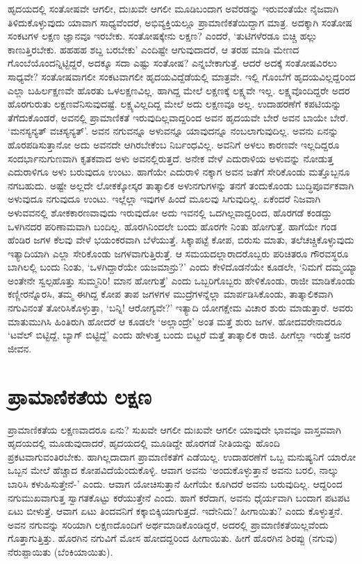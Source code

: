ಹೃದಯದಲ್ಲಿ ಸಂತೋಷವೇ ಆಗಲೀ, ದುಃಖವೇ ಆಗಲೀ ಮೂಡಿಬಂದಾಗ ಅವೆರಡನ್ನು ಇರುವಂತೆಯೇ ನೈಜವಾಗಿ ತಿಳಿದುಕೊಳ್ಳುವುದು ಯಾವಾಗ ಸಾಧ್ಯವೆಂದರೆ, ಅಭಿವ್ಯಕ್ತಿಯಲ್ಲೂ ಪ್ರಾಮಾಣಿಕತೆಯಿದ್ದಾಗ ಮಾತ್ರ. ಅದಕ್ಕಾಗಿ ಸಂತೋಷ ಸಂಕಟಗಳ ಲಕ್ಷಣ ಜ್ಞಾನವೂ ಇರಬೇಕು. ಸಂತೋಷಕ್ಕೇನು ಲಕ್ಷಣ? ಎಂದರೆ, `ತುಟಿಗಳೆರಡೂ ಬಿಚ್ಚಿ ಹಲ್ಲು ಕಾಣುತ್ತಿರಬೇಕು. ಹಹಹಹ ಶಬ್ದ ಬರಬೇಕು' ಎಂದಿಷ್ಟೇ ಆಗುವುದಾದರೆ, ಆ ತರಹ ಮಾಡಿ ಮೇಣದ ಗೊಂಬೆಯೊಂದನ್ನಿಟ್ಟಿದ್ದರೆ, ಅದಕ್ಕೂ ಸದಾ ಎಷ್ಟು ಸಂತೋಷ? ಎನ್ನಬೇಕಾಗುತ್ತೆ. ಆದರೆ ಅದಕ್ಕೆ ಸಂತೋಷವಿರಲು ಸಾಧ್ಯವೇ? ಸಂತೋಷವಾಗಲೀ ಸಂಕಟವಾಗಲೀ ಹೃದಯವಿದ್ದೆಡೆಯಲ್ಲಿ ಮಾತ್ರವೇ. ಇಲ್ಲಿ ಗೊಂಬೆಗೆ ಹೃದಯವಿಲ್ಲದ್ದರಿಂದ ಎಲ್ಲಾ ಬಹಿರ್ಲಕ್ಷಣವೇ ಹೊರತು ಒಳಲಕ್ಷಣವಿಲ್ಲ. ಹಾಗಿದ್ದ ಮೇಲೆ ಲಕ್ಷಣಕ್ಕೆ ಲಕ್ಷ್ಯವೇ ಇಲ್ಲ. ಲಕ್ಷ್ಯವೊಂದಿದ್ದರೇ ಅದರ ಹೊರಗುರುತು ಲಕ್ಷಣವೆನಿಸುವುದಷ್ಟೆ. ಲಕ್ಷ್ಯವಿಲ್ಲದಿದ್ದ ಮೇಲೆ ಅದು ಲಕ್ಷಣವೂ ಅಲ್ಲ. ಉದಾಹರಣೆಗೆ ಕಪಟಿಯನ್ನು ತೆಗೆದುಕೊಂಡರೆ, ಅವನಲ್ಲಿ ಪ್ರಾಮಾಣಿಕತೆ ಇರುವುದಿಲ್ಲವಾದ್ದರಿಂದ ಅವನ ಹೃದಯವೇ ಬೇರೆ ಅವನ ಬಾಯೇ ಬೇರೆ. `ಮನಸ್ಯನ್ಯತ್ ವಚಸ್ಯನ್ಯತ್'.\label{102} ಅವನ ನಗುವನ್ನೂ ಅಳುವನ್ನೂ ಯಾವುದನ್ನೂ ನಂಬಲಾಗುವುದಿಲ್ಲ. ಅವನು ಏನನ್ನು  ಹೊರಪಡಿಸುತ್ತಾನೋ ಅದು ಅವನದೇ ಆಗಿರಬೇಕೆಂಬ ನಿರ್ಬಂಧವಿಲ್ಲ. ಅವನಿಗೆ ಅಳಲು ಕಾರಣವೇ ಇಲ್ಲದಿದ್ದರೂ ಸಂದರ್ಭಾನುಗುಣವಾಗಿ ಕೃತಕವಾದ ಅಳು ಅವನಲ್ಲಿರುತ್ತದೆ. ಅನೇಕ ವೇಳೆ ಎದುರಾಳಿಯ ಅಳುವನ್ನು ನೋಡುತ್ತ ಎದುರಾಳಿಗೂ ಅಳು ಬರುವುದೂ ಉಂಟು. ಹಾಗೆಯೇ ಎದುರಾಳಿ ನಕ್ಕಾಗ ಅವನ ಜತೆಗೆ ಸೇರಿಕೊಂಡು ಮತ್ತೊಬ್ಬನೂ ನಗಬಹುದು. ಅಷ್ಟೇ ಅಲ್ಲದೇ ಲೋಕಕ್ಕೋಸ್ಕರ ತಾತ್ಕಾಲಿಕ ಅಳುನಗುಗಳನ್ನು ತನಗೆ ತಂದುಕೊಂಡು ಬುದ್ಧಿಪೂರ್ವಕವಾಗಿ ಅಳುವುದೂ ನಗುವುದೂ ಉಂಟು. ಇಲ್ಲೆಲ್ಲಾ ಇವುಗಳ ಹಿಂದೆ ಮೂಲವು ಸಿಗುವುದಿಲ್ಲ. ಏಕೆಂದರೆ ನಿಜವಾಗಿ ಅಳುವವನಲ್ಲಿ ಶೋಕಕಾರಣವಾವುದು ಇರುವುದೋ ಅದು ಇವನಲ್ಲಿ ಒದಗಿಲ್ಲವಾದ್ದರಿಂದ, ಹೊರಗಡೆ ಕಂಡದ್ದು ಒಳಗಿನದರ ಪರಿಣಾಮವಾಗಿ ಬಂದಿಲ್ಲ. ಹೊರಗಿನಿಂದಲೇ ಬಂದು ಹೊರಗೇ ನಿಂತು ಹೋಗುತ್ತೆ. ಹಾಗೆಯೇ ಗಂಡ ಹೆಂಡಿರ ಜಗಳ ಕೆಲವು ವೇಳೆ ಭಯಂಕರವಾಗಿ ಬೆಳೆಯುತ್ತೆ. ಸಿಕ್ಕಾಪಟ್ಟೆ ಕೋಪ, ಬಿರುಸು ಮಾತು, ತಲೆಚಚ್ಚಿಕೊಳ್ಳುವುದು ಇತ್ಯಾದಿಯಾಗಿ ಎಲ್ಲಾ ಸೇರಿಕೊಂಡು ಜಗಳವಾಗುತ್ತಿರುತ್ತೆ. ಆ ಸಮಯದಲ್ಲಾರಾದರೊಬ್ಬರು ಪರಿಚಿತರೂ ಗೌರವಸ್ಥರೂ ಬಾಗಿಲಲ್ಲಿ ಬಂದು ನಿಂತು, `ಒಳಗಿದ್ದಾರೆಯೇ ಯಜಮಾನ್ರು?' ಎಂದು ಕೇಳಿದೊಡನೆಯೇ ಕೂಡಲೇ, `ನಿಮಗೆ ದಮ್ಮಯ್ಯಾ ಅಂತೇನೇ ಸ್ವಲ್ಪಹೊತ್ತು ಸುಮ್ಮನಿರಿ! ಮಾನ ಹೋಗುತ್ತೆ' ಎಂದು ಒಬ್ಬರಿಗೊಬ್ಬರು ಹೇಳಿಕೊಂಡು, ರಾಜೀ ಮಾಡಿಕೊಂಡು ಕಣ್ಣೀರನ್ನೊರಸಿ, ತಮ್ಮ ಈಗಿದ್ದ ಕೋಪ ತಾಪ ಜಗಳಗಳ ಮುದ್ರೆಗಳನ್ನೆಲ್ಲಾ ಮಾರ್ಪಡಿಸಿಕೊಂಡು, ತಾತ್ಕಾಲಿಕವಾಗಿ ನಗುವಿನಂತೆ ತೋರಿಸಿಕೊಳ್ಳುತ್ತಾ, `ಬನ್ನಿ! ಆರೋಗ್ಯವೇ?' ಇತ್ಯಾದಿ ಯೋಗಕ್ಷೇಮ ವಿಚಾರ ಶುರು ಮಾಡುತ್ತಾರೆ. ಅವರು ಮಾತುಮುಗಿಸಿ ಹಿಂತಿರುಗಿ ಹೋದರೆ ಆ ಕೂಡಲೇ `ಅಲ್ಲಾಂದ್ರೇ' ಅಂತ ಮತ್ತೆ ಶುರು ಜಗಳ. ಹೋದವರೇನಾದರೂ `ಟವೆಲ್ ಬಿಟ್ಟಿದ್ದೆ, ಬ್ಯಾಗ್ ಬಿಟ್ಟಿದ್ದೆ' ಎಂದು ಹೇಳುತ್ತ ಬಂದು ಬಿಟ್ಟರೆ ಮತ್ತೆ ತಾತ್ಕಾಲಿಕ ರಾಜಿ. ಹೀಗೆಲ್ಲಾ ಇರುತ್ತೆ ಜನರ ಜೀವನ.

\section*{ಪ್ರಾಮಾಣಿಕತೆಯ ಲಕ್ಷಣ}

ಪ್ರಾಮಾಣಿಕತೆಯ ಲಕ್ಷಣವಾದರೂ ಏನು? ಸುಖವೇ ಆಗಲೀ ದುಃಖವೇ ಆಗಲೀ ಯಾವುದೇ ಭಾವವೂ ವಾಸ್ತವವಾಗಿ ಹೃದಯದಲ್ಲಿ ಮೂಡುವುದಾದರೆ, ಹೃದಯದಲ್ಲಿ ಮೂಡಿದ್ದೇ ಹೊರಗಡೆ ನೀತಿಯನ್ನು ಹೊಂದಿ ಪ್ರಕಟವಾಗುವಂತಿರಬೇಕು. ಹಾಗಿಲ್ಲದಾದಾಗ ಪ್ರಾಮಾಣಿಕತೆಗೆ ಎಡೆಯಿಲ್ಲ. ಉದಾಹರಣೆಗೆ ಒಬ್ಬ ಮನುಷ್ಯನಿಗೆ ಯಾರೋ ಒಬ್ಬನ ಮೇಲೆ ಹೆಚ್ಚಾದ ಕೋಪವಿದೆಯೆಂದುಕೊಳ್ಳಿ. ಆವಾಗ ಅವನು `ಅಂದುಕೊಳ್ಳುತ್ತಾನೆ ಅವನು ಬರಲಿ, ನಾಲ್ಕು ಬಾರಿಸಿ ಕಳುಹಿಸುತ್ತೇನೆ-' ಎಂದು. ಆವಾಗ ಯೋಚಿಸುತ್ತಾನೆ ಹೀಗೆಯೇ ಕೂಗಿದರೆ ಅವನು ಬರುವುದಿಲ್ಲ. ಆದ್ದರಿಂದ ನಗುಮುಖವಾಗುತ್ತ ಸ್ವಾಗತಕೊಟ್ಟು ಕರೆಯುತ್ತೇನೆ ಎಂದು. ಹಾಗೆ ಕರೆದಾಗ, ಅವನು ಧೈರ್ಯವಾಗಿ ಬಂದಾಗ ಪಟಪಟ ಏಟು ಬೀಳುತ್ತೆ. ಆವಾಗ ಏಟು ತಿಂದವನಿಗೆ ಕಕ್ಕಾಬಿಕ್ಕಿಯಾಗುತ್ತದೆ. ಇದೇನಿದು? ಹೀಗಾಯಿತು? ಎಂದು ಕೊಳ್ಳುತ್ತನೆ. ಅವನ ನಗುವನ್ನು ಸರಿಯಾಗಿ ಲಕ್ಷಣದೊಂದಿಗೆ ಅರ್ಥಮಾಡಿಕೊಂಡಿದ್ದರೆ, ಅದರಲ್ಲಿ ಪ್ರಾಮಾಣಿಕತೆಯಿಲ್ಲವೆಂದು ಗೊತ್ತಾಗುತ್ತಿತ್ತು. ಹೊರಗಿನ ನಗುವಿಗೆ ಮೋಸ ಹೋದದ್ದರಿಂದ ಹೀಗಾಯಿತು. ಹೀಗೆ ಹೊರಗಿನ ಶಿರಪ್ಪು (ನಗುವು) ನೆರುಪ್ಪಾಯಿತು (ಬೆಂಕಿಯಾಯಿತು).

